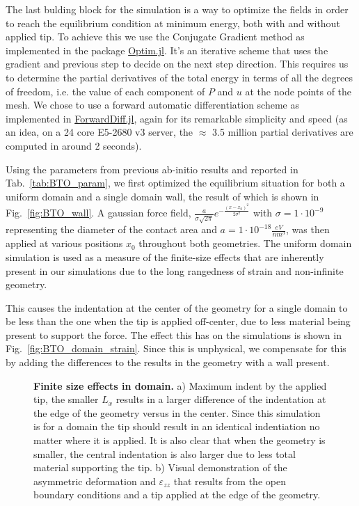The last bulding block for the simulation is a way to optimize the fields in order to reach the equilibrium condition at minimum energy, both with and without applied tip.
To achieve this we use the Conjugate Gradient method \cite{Hestenes1952,Hager2005} as implemented in the package \href{https://github.com/JuliaNLSolvers/Optim.jl}{Optim.jl}.
It's an iterative scheme that uses the gradient and previous step to decide on the next step direction. 
This requires us to determine the partial derivatives of the total energy in terms of all the degrees of freedom, i.e. the value of each component of $P$ and $u$ at the node points of the mesh.
We chose to use a forward automatic differentiation scheme as implemented in \href{www.juliadiff.org/ForwardDiff.jl/latest/}{ForwardDiff.jl}, again for its remarkable simplicity and speed (as an idea, on a 24 core E5-2680 v3 server, the $\approx$ 3.5 million partial derivatives are computed in around 2 seconds).

Using the parameters from previous ab-initio results \cite{Marton2010} and reported in Tab.~\ref{tab:BTO_param}, we first optimized the equilibrium situation for both a uniform domain and a single domain wall, the result of which is shown in Fig.~\ref{fig:BTO_wall}.
A gaussian force field, $\frac{a}{\sigma \sqrt{2\pi}}e^{-\frac{(x-x_0)^2}{2\sigma^2}}$ with $\sigma = 1 \cdot 10^{-9}$ representing the diameter of the contact area and $a = 1 \cdot 10^{-18} \frac{eV}{nm^3}$, was then applied at various positions $x_0$ throughout both geometries.
The uniform domain simulation is used as a measure of the finite-size effects that are inherently present in our simulations due to the long rangedness of strain and non-infinite geometry.

This causes the indentation at the center of the geometry for a single domain to be less than the one when the tip is applied off-center, due to less material being present to support the force.
The effect this has on the simulations is shown in Fig.~\ref{fig:BTO_domain_strain}.
Since this is unphysical, we compensate for this by adding the differences to the results in the geometry with a wall present.

\begin{figure}
	\caption{{\bf Finite size effects in domain.} a) Maximum indent by the applied tip, the smaller $L_x$ results in a larger difference of the indentation at the edge of the  geometry versus in the center. Since this simulation is for a domain the tip should result in an identical indentiation no matter where it is applied. It is also clear that when the geometry is smaller, the central indentation is also larger due to less total material supporting the tip. b) Visual demonstration of the asymmetric deformation and $\varepsilon_{zz}$ that results from the open boundary conditions and a tip applied at the edge of the geometry.}
\end{figure}

